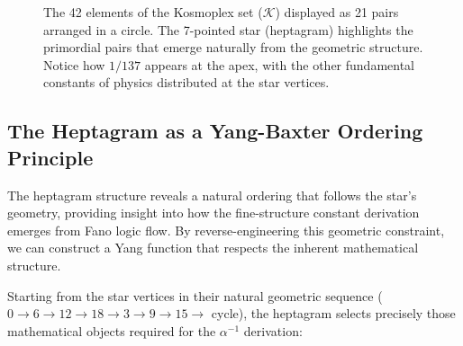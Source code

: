 \documentclass[pdflatex,sn-mathphys-num]{sn-jnl}
\theoremstyle{thmstyleone}
\theoremstyle{thmstyletwo}
\theoremstyle{thmstylethree}
\begin{document}
\begin{figure}[ht]

\caption{The 42 elements of the Kosmoplex set ($\mathcal{K}$) displayed as 21 pairs arranged in a circle. The 7-pointed star (heptagram) highlights the primordial pairs that emerge naturally from the geometric structure. Notice how $1/137$ appears at the apex, with the other fundamental constants of physics distributed at the star vertices.}
\label{fig:glyph_heptagram}
\end{figure}


\subsection{The Heptagram as a Yang-Baxter Ordering Principle}

The heptagram structure reveals a natural ordering that follows the star's geometry, providing insight into how the fine-structure constant derivation emerges from Fano logic flow. By reverse-engineering this geometric constraint, we can construct a Yang function that respects the inherent mathematical structure.

Starting from the star vertices in their natural geometric sequence ($0 \to 6 \to 12 \to 18 \to 3 \to 9 \to 15 \to$ cycle), the heptagram selects precisely those mathematical objects required for the $\alpha^{-1}$ derivation:
\end{document}
